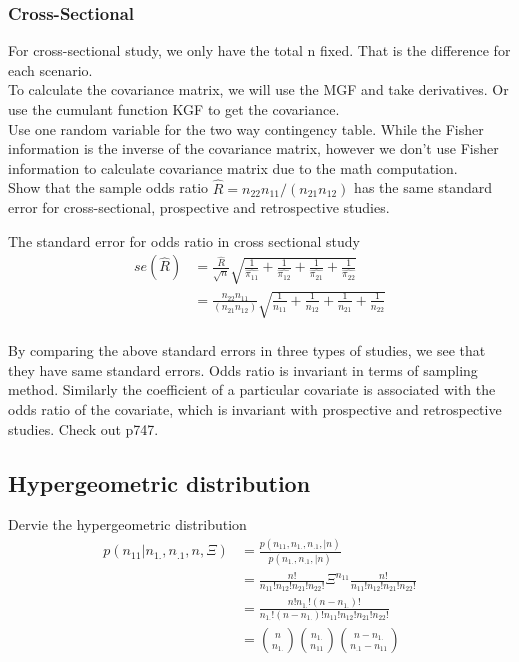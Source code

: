 \documentclass[11pt]{article} %
\begin{document}
	\subsubsection{Cross-Sectional}
	For cross-sectional study, we only have the total n fixed. That is the difference for each scenario. \\
	To calculate the covariance matrix, we will use the MGF and take derivatives. Or use the cumulant function KGF to get the covariance.\\
	Use one random variable for the two way contingency table. While the Fisher information is the inverse of the covariance matrix, however we don't use Fisher information to calculate covariance matrix due to the math computation.\\
	
	Show that the sample odds ratio $\hat R = n_{22}n_{11}/(n_{21}n_{12})$ has the same standard error for cross-sectional, prospective and retrospective studies.
	
	
	The standard error for odds ratio in cross sectional study\\
	\begin{align*}
		se(\hat R) &= \frac{\hat{R}}{\sqrt{n}} \sqrt{\frac{1}{\hat{\pi_{11}}} + \frac{1}{\hat{\pi_{12}}} + \frac{1}{\hat{\pi_{21}}} + \frac{1}{\hat{\pi_{22}}}}\\
		&= \frac{{n_{22}n_{11}}}{(n_{21}n_{12})} \sqrt{\frac{1}{n_{11}} + \frac{1}{n_{12}} + \frac{1}{n_{21}} + \frac{1}{n_{22}}}\\
	\end{align*}

	
	By comparing the above standard errors in three types of studies, we see that they have same standard errors. Odds ratio is invariant in terms of sampling method. 
Similarly the coefficient of a particular covariate is associated with the odds ratio of the covariate, which is invariant with prospective and retrospective studies. Check out p747.


\subsection{Hypergeometric distribution} 
Dervie the hypergeometric distribution 
\begin{align*}
	p(n_{11}|n_{1.}, n_{.1}, n, \Xi) &=  \frac{p(n_{11}, n_{1.}, n_{.1}, |n)}{p( n_{1.}, n_{.1}, |n)} \\
	&= \frac{n!}{n_{11}!n_{12}!n_{21}!n_{22}!} \Xi^{n_{11}} 
	\frac{n!}{n_{11}!n_{12}!n_{21}!n_{22}!} \\
	&=  \frac{n! n_{1.}! (n-n_{1.})!}{n_{1.}! (n-n_{1.})! n_{11}!n_{12}!n_{21}!n_{22}!} \\
	&= {n \choose n_{1.}} {n_{1.} \choose n_{11}} {n-n_{1.} \choose n_{.1}-n_{11}} 
\end{align*}
\end{document}
